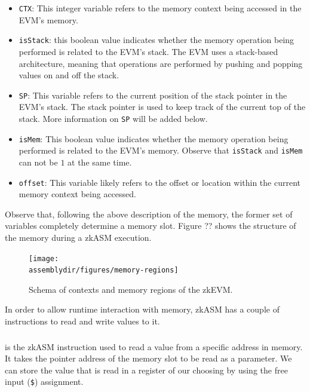 \begin{itemize}

\item \texttt{CTX}: This integer variable refers to the memory context being accessed in the EVM's memory. 

\item \texttt{isStack}:  this boolean value indicates whether the memory operation being performed is related to the EVM's stack. The EVM uses a stack-based architecture, meaning that operations are performed by pushing and popping values on and off the stack.

\item \texttt{SP}: This variable refers to the current position of the stack pointer in the EVM's stack. The stack pointer is used to keep track of the current top of the stack. More information on \texttt{SP} will be added below.

\item \texttt{isMem}: This boolean value indicates whether the memory operation being performed is related to the EVM's memory. Observe that \texttt{isStack} and \texttt{isMem} can not be $1$ at the same time. 

\item \texttt{offset}:  This variable likely refers to the offset or location within the current memory context being accessed.

\end{itemize}

Observe that, following the above description of the memory, the former set of variables completely determine a memory slot. Figure ?? shows the structure of the memory during a zkASM execution.

\begin{figure}[H]
\centering
\texttt{[image: \\assemblydir/figures/memory-regions]}
\caption{Schema of contexts and memory regions of the zkEVM.}
\label{fig:memory-regions}
\end{figure}

In order to allow runtime interaction with memory, zkASM has a couple of instructions to read and write values to it.


\subsubsection{\MLOAD}


\MLOAD is the zkASM instruction used to read a value from a specific address in memory. It takes the pointer address of the memory slot to be read as a parameter. We can store the value that is read in a register of our choosing by using the free input (\texttt{\$}) assignment. 

